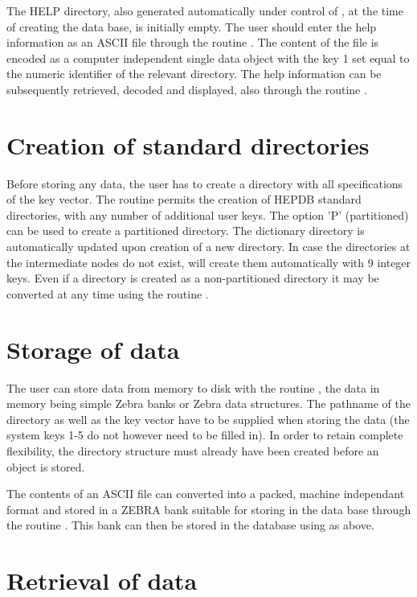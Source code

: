 The HELP directory, also generated automatically under control of
, at the time of creating the data base, is initially empty. The
user should enter the help information as an ASCII file through the
routine . The content of the file is encoded as a computer
independent single data object with the key 1 set equal to the numeric
identifier of the relevant directory. The help information can be
subsequently retrieved, decoded and displayed, also through the routine
.

\section{Creation of standard directories}

Before storing any data, the user has to create a directory with all
specifications of the key vector. The routine  permits the creation of
HEPDB standard directories, with any number of additional user keys. The
option 'P' (partitioned) can be used to create a partitioned directory.
The dictionary directory is automatically updated upon creation of a new
directory. In case the directories at the intermediate nodes do not
exist,  will create them automatically with 9 integer keys.
Even if a directory is created as a non-partitioned directory it may
be converted at any time using the routine .
\section{Storage of data}
The user can store data from memory to disk with the
routine  , the data in memory being simple Zebra banks
or Zebra data structures.
The pathname of the directory as well as the key
vector have to be supplied when storing the data (the system keys 1-5
do not however need to be filled in). In order to retain complete
flexibility, the directory structure must already have been created
before an object is stored.

The contents of an ASCII file can converted into a packed, machine independant
format and stored in a ZEBRA bank suitable for storing in the data base
through the routine . This bank can then be stored in the
database using  as above.

\section{Retrieval of data}

